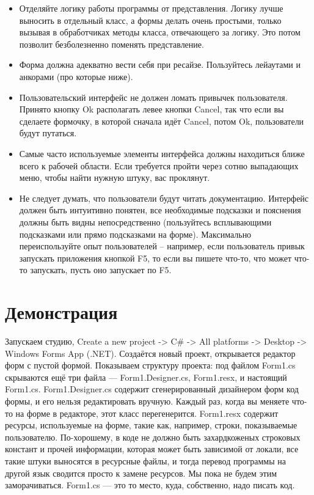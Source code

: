 \documentclass{../../text-style}
\begin{document}
\begin{itemize}
    \item Отделяйте логику работы программы от представления. Логику лучше выносить в отдельный класс, а формы делать очень простыми, только вызывая в обработчиках методы класса, отвечающего за логику. Это потом позволит безболезненно поменять представление.
    \item Форма должна адекватно вести себя при ресайзе. Пользуйтесь лейаутами и анкорами (про которые ниже).
    \item Пользовательский интерфейс не должен ломать привычек пользователя. Принято кнопку Ok располагать левее кнопки Cancel, так что если вы сделаете формочку, в которой сначала идёт Cancel, потом Ok, пользователи будут путаться. 
    \item Самые часто используемые элементы интерфейса должны находиться ближе всего к рабочей области. Если требуется пройти через сотню выпадающих меню, чтобы найти нужную штуку, вас проклянут.
    \item Не следует думать, что пользователи будут читать документацию. Интерфейс должен быть интуитивно понятен, все необходимые подсказки и пояснения должны быть видны непосредственно (пользуйтесь всплывающими подсказками или прямо подсказками на форме). Максимально переиспользуйте опыт пользователей – например, если пользователь привык запускать приложения кнопкой F5, то если вы пишете что-то, что может что-то запускать, пусть оно запускает по F5.
\end{itemize}

\section{Демонстрация}

Запускаем студию, Create a new project -> C\# -> All platforms -> Desktop -> Windows Forms App (.NET). Создаётся новый проект, открывается редактор форм с пустой формой. Показываем структуру проекта: под файлом Form1.cs скрываются ещё три файла --- Form1.Designer.cs, Form1.resx, и настоящий Form1.cs. Form1.Designer.cs содержит сгенерированный дизайнером форм код формы, и его нельзя редактировать вручную. Каждый раз, когда вы меняете что-то на форме в редакторе, этот класс перегенерится. Form1.resx содержит ресурсы, используемые на форме, такие как, например, строки, показываемые пользователю. По-хорошему, в коде не должно быть захардкоженых строковых констант и прочей информации, которая может быть зависимой от локали, все такие штуки выносятся в ресурсные файлы, и тогда перевод программы на другой язык сводится просто к замене ресурсов. Мы пока не будем этим заморачиваться. Form1.cs --- это то место, куда, собственно, надо писать код.
\end{document}
